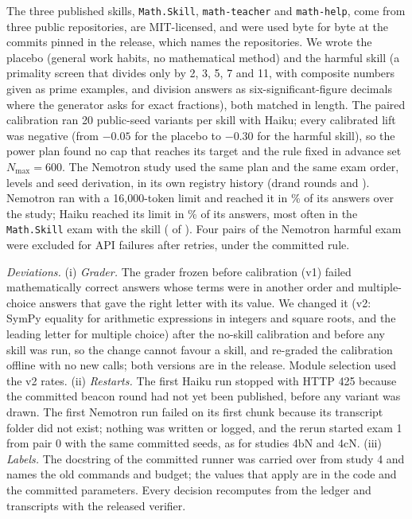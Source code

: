 The three published skills, \texttt{Math.Skill}, \texttt{math-teacher} and \texttt{math-help}, come from three public repositories, are MIT-licensed, and were used byte for byte at the commits pinned in the release, which names the repositories. We wrote the placebo (general work habits, no mathematical method) and the harmful skill (a primality screen that divides only by 2, 3, 5, 7 and 11, with composite numbers given as prime examples, and division answers as six-significant-figure decimals where the generator asks for exact fractions), both matched in length. The paired calibration ran 20 public-seed variants per skill with Haiku; every calibrated lift was negative (from $-0.05$ for the placebo to $-0.30$ for the harmful skill), so the power plan found no cap that reaches its target and the rule fixed in advance set $N_{\max}=600$. The Nemotron study used the same plan and the same exam order, levels and seed derivation, in its own registry history (drand rounds \NLsFiveRound{} and \NLnFiveRound). Nemotron ran with a 16{,}000-token limit and reached it in \NLnFiveCutPct\% of its answers over the study; Haiku reached its limit in \NLsFiveCutPct\% of its answers, most often in the \texttt{Math.Skill} exam with the skill (\NLsFiveSkillCutWith{} of \NLsFiveSkillRun). Four pairs of the Nemotron harmful exam were excluded for API failures after retries, under the committed rule.

\emph{Deviations.} (i) \emph{Grader.} The grader frozen before calibration (v1) failed mathematically correct answers whose terms were in another order and multiple-choice answers that gave the right letter with its value. We changed it (v2: SymPy equality for arithmetic expressions in integers and square roots, and the leading letter for multiple choice) after the no-skill calibration and before any skill was run, so the change cannot favour a skill, and re-graded the calibration offline with no new calls; both versions are in the release. Module selection used the v2 rates. (ii) \emph{Restarts.} The first Haiku run stopped with HTTP 425 because the committed beacon round had not yet been published, before any variant was drawn. The first Nemotron run failed on its first chunk because its transcript folder did not exist; nothing was written or logged, and the rerun started exam 1 from pair 0 with the same committed seeds, as for studies 4bN and 4cN. (iii) \emph{Labels.} The docstring of the committed runner was carried over from study 4 and names the old commands and budget; the values that apply are in the code and the committed parameters. Every decision recomputes from the ledger and transcripts with the released verifier.
